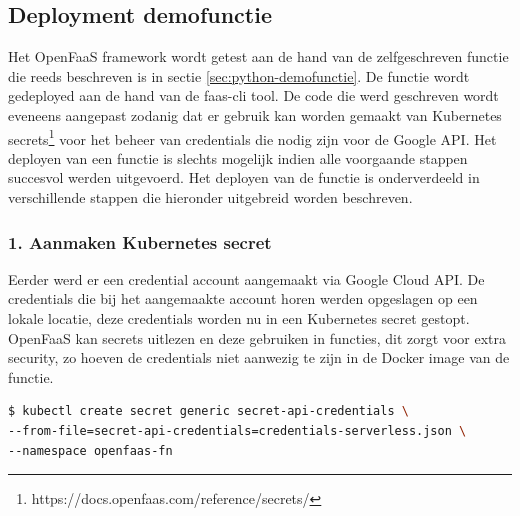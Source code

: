 \subsection{Deployment demofunctie}
Het OpenFaaS framework wordt getest aan de hand van de zelfgeschreven functie die reeds beschreven is in sectie \ref{sec:python-demofunctie}. De functie wordt gedeployed aan de hand van de faas-cli tool. De code die werd geschreven wordt eveneens aangepast zodanig dat er gebruik kan worden gemaakt van Kubernetes secrets\footnote{https://docs.openfaas.com/reference/secrets/} voor het beheer van credentials die nodig zijn voor de Google API. Het deployen van een functie is slechts mogelijk indien alle voorgaande stappen succesvol werden uitgevoerd. Het deployen van de functie is onderverdeeld in verschillende stappen die hieronder uitgebreid worden beschreven.

\subsubsection{1. Aanmaken Kubernetes secret}
Eerder werd er een credential account aangemaakt via Google Cloud API. De credentials die bij het aangemaakte account horen werden opgeslagen op een lokale locatie, deze credentials worden nu in een Kubernetes secret gestopt. OpenFaaS kan secrets uitlezen en deze gebruiken in functies, dit zorgt voor extra security, zo hoeven de credentials niet aanwezig te zijn in de Docker image van de functie.

\begin{lstlisting}[language=bash]
$ kubectl create secret generic secret-api-credentials \ 
--from-file=secret-api-credentials=credentials-serverless.json \
--namespace openfaas-fn
\end{lstlisting}


